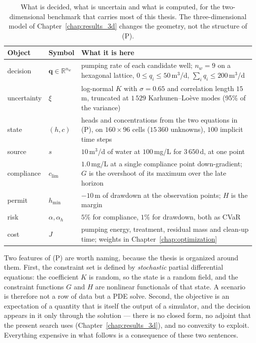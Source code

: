 \documentclass[11pt]{article}
\begin{document}
\begin{table}[t]
  \centering
  \small
  \begin{tabularx}{\textwidth}{@{}l l X@{}}
    \toprule
    Object & Symbol & What it is here \\
    \midrule
    decision & $\mathbf q\in\mathbb{R}^{n_w}$ &
      pumping rate of each candidate well; $n_w=9$ on a hexagonal lattice,
      $0\le q_i\le 50$\,m$^3$/d, $\sum_i q_i\le 200$\,m$^3$/d \\
    uncertainty & $\xi$ &
      log-normal $K$ with $\sigma=0.65$ and correlation length $15$\,m,
      truncated at $1\,529$ Karhunen--Lo\`eve modes (95\% of the variance) \\
    state & $(h,c)$ &
      heads and concentrations from the two equations in (P), on
      $160\times96$ cells ($15\,360$ unknowns), $100$ implicit time steps \\
    source & $s$ &
      $10$\,m$^3$/d of water at $100$\,mg/L for $3\,650$\,d, at one point \\
    compliance & $c_{\lim}$ &
      $1.0$\,mg/L at a single compliance point down-gradient; $G$ is the
      overshoot of its maximum over the late horizon \\
    permit & $h_{\min}$ &
      $-10$\,m of drawdown at the observation points; $H$ is the margin \\
    risk & $\alpha,\alpha_h$ &
      $5\%$ for compliance, $1\%$ for drawdown, both as CVaR \\
    cost & $J$ &
      pumping energy, treatment, residual mass and clean-up time; weights in
      Chapter~\ref{chap:optimization} \\
    \bottomrule
  \end{tabularx}
  \caption{What is decided, what is uncertain and what is computed, for the
    two-dimensional benchmark that carries most of this thesis. The
    three-dimensional model of Chapter~\ref{chap:results_3d} changes the geometry,
    not the structure of (P).}
  \label{tab:int-objects}
\end{table}

Two features of (P) are worth naming, because the thesis is organized around
them. First, the constraint set is defined by \emph{stochastic} partial
differential equations: the coefficient $K$ is random, so the state is a random
field, and the constraint functions $G$ and $H$ are nonlinear functionals of that
state. A scenario is therefore not a row of data but a PDE solve. Second, the
objective is an expectation of a quantity that is itself the output of a
simulator, and the decision appears in it only through the solution --- there is
no closed form, no adjoint that the present search uses
(Chapter~\ref{chap:results_3d}), and no convexity to exploit. Everything
expensive in what follows is a consequence of these two sentences.
\end{document}
